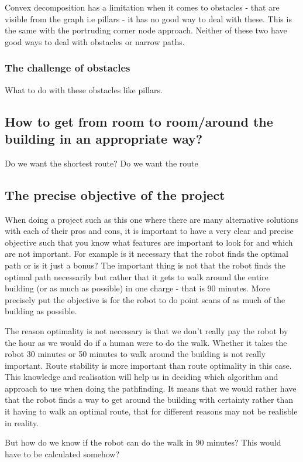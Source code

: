 Convex decomposition has a limitation when it comes to obstacles - that are visible from the graph i.e pillars - it has no good way to deal with these. This is the same with the portruding corner node approach. Neither of these two have good ways to deal with obstacles or narrow paths.

\subsubsection{The challenge of obstacles}
What to do with these obstacles like pillars.


\subsection{How to get from room to room/around the building in an appropriate way?}
Do we want the shortest route?
Do we want the route

\subsection{The precise objective of the project}
When doing a project such as this one where there are many alternative solutions with each of their pros and cons, it is important to have a very clear and precise objective such that you know what features are important to look for and which are not important. For example is it necessary that the robot finds the optimal path or is it just a bonus? The important thing is not that the robot finds the optimal path necessarily but rather that it gets to walk around the entire building (or as much as possible) in one charge - that is 90 minutes. More precisely put the objective is for the robot to do point scans of as much of the building as possible.

The reason optimality is not necessary is that we don't really pay the robot by the hour as we would do if a human were to do the walk.
Whether it takes the robot 30 minutes or 50 minutes to walk around the building is not really important. Route stability is more important than route optimality in this case.
This knowledge and realisation will help us in deciding which algorithm and approach to use when doing the pathfinding. It means that we would rather have that the robot finds a way to get around the building with certainty rather than it having to walk an optimal route, that for different reasons may not be realisble in reality.


But how do we know if the robot can do the walk in 90 minutes? 
This would have to be calculated somehow?

